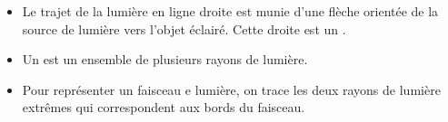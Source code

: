 \begin{mybilan}

	\begin{itemize}
		\item Le trajet de la lumière en ligne droite est  munie d'une flèche orientée de la source de lumière vers l'objet éclairé. Cette droite est un .
		\item Un  est un ensemble de plusieurs rayons de lumière.
		\item Pour représenter un faisceau e lumière, on trace les deux rayons de lumière extrêmes qui correspondent aux bords du faisceau.
	\end{itemize}
\end{mybilan}